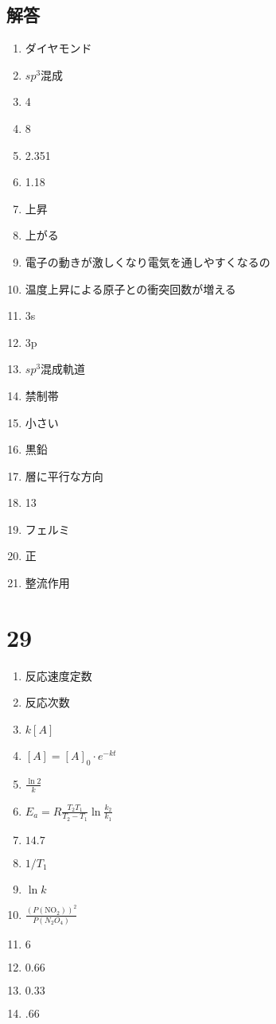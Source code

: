 \documentclass[dvipdfmx]{article}
\begin{document}
    \subsection*{解答}
      \begin{enumerate}
        \item ダイヤモンド 
        \item $sp^3$混成 
        \item 4
        \item 8
        \item 2.351
        \item 1.18
        \item 上昇
        \item 上がる
        \item 電子の動きが激しくなり電気を通しやすくなるの
        \item 温度上昇による原子との衝突回数が増える
        \item 3s
        \item 3p
        \item $sp^3$混成軌道
        \item 禁制帯
        \item 小さい
        \item 黒鉛
        \item 層に平行な方向
        \item 13
        \item フェルミ
        \item 正
        \item 整流作用
      \end{enumerate}
      \section*{29}
        \begin{enumerate}
          \item 反応速度定数
          \item 反応次数
          \item $k[A]$
          \item $[A] = [A]_0 \cdot e^{-kt}$
          \item $\frac{\ln 2}{k}$
          \item $E_a = R\frac{T_2 T_1}{T_2 - T_1} \ln \frac{k_2}{k_1}$
          \item $14.7$
          \item $1/T_1$
          \item $\ln k$
          \item $\frac{(P(\mathrm{NO_2}))^2}{P(N_2O_4)}$
          \item $6$
          \item $0.66$
          \item $0.33$
          \item $.66$
        \end{enumerate}
\end{document}

